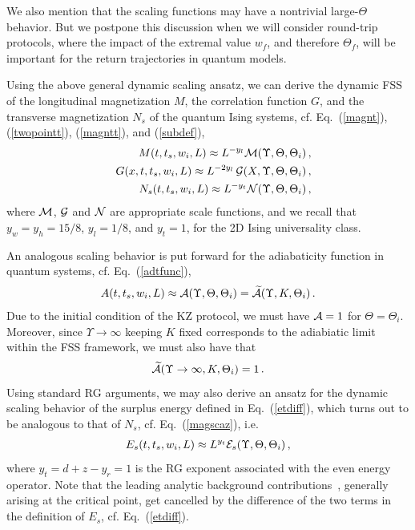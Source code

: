 We also mention that the scaling functions may have a nontrivial
large-$\Theta$ behavior.  But we postpone this discussion when we will
consider round-trip protocols, where the impact of the extremal value
$w_f$, and therefore $\Theta_f$, will be important for the return
trajectories in quantum models.


Using the above general dynamic scaling ansatz, we can derive the
dynamic FSS of the longitudinal magnetization $M$, the correlation
function $G$, and the transverse magnetization $N_s$ of the quantum
Ising systems, cf. Eq.~(\ref{magnt}), (\ref{twopointt}),
(\ref{magntt}), and (\ref{subdef}),
\begin{eqnarray}
&&  M(t,t_s,w_i,L) \approx L^{-y_l} {\cal
    M}(\Upsilon,\Theta,\Theta_i)\,,
  \label{magsca}\\
&&    G(x,t,t_s,w_i,L) \approx L^{-2y_l}\,
  {\cal G}(X,\Upsilon,\Theta,\Theta_i)\,,
  \label{G2sca}\\
    &&  N_s(t,t_s,w_i,L) \approx L^{-y_t} {\cal
    N}(\Upsilon,\Theta,\Theta_i)\,,
  \label{magscaz}
\end{eqnarray}
where ${\cal M}$, ${\cal G}$ and ${\cal N}$ are appropriate scale
  functions, and we recall that $y_w=y_h=15/8$, $y_l=1/8$, and
  $y_t=1$, for the 2D Ising universality class.

An analogous scaling behavior is put forward for the adiabaticity
function in quantum systems, cf. Eq.~(\ref{adtfunc}),
\begin{eqnarray}
  A(t,t_s,w_i,L) \approx {\cal A}(\Upsilon,\Theta,\Theta_i)
  = \widetilde{\cal A}(\Upsilon,K,\Theta_i)\,.
\label{wsca2}
\end{eqnarray}
Due to the initial condition of the KZ protocol, we must have ${\cal
  A}=1$ for $\Theta=\Theta_i$. Moreover, since $\Upsilon\to\infty$
keeping $K$ fixed corresponds to the adiabiatic limit within the FSS
framework, we must also have that
\begin{equation}
\widetilde{\cal A}(\Upsilon\to\infty,K,\Theta_i)=1\,.
\label{adlim}
\end{equation}
Using standard RG arguments, we may also derive an ansatz for the
dynamic scaling behavior of the surplus energy defined in
Eq.~(\ref{etdiff}), which turns out to be analogous
to that of $N_s$, cf. Eq.~(\ref{magscaz}), i.e.
\begin{eqnarray}
E_s(t,t_s,w_i,L) \approx L^{y_t} {\cal E}_s(\Upsilon,\Theta,\Theta_i)\,,
\label{essca}
\end{eqnarray}
where $y_t=d+z-y_r=1$ is the RG exponent associated with the even
energy operator. Note that the leading analytic background
contributions~\cite{CPV-14,RV-21}, generally arising at the critical
point, get cancelled by the difference of the two terms in the
definition of $E_s$, cf. Eq.~(\ref{etdiff}).

